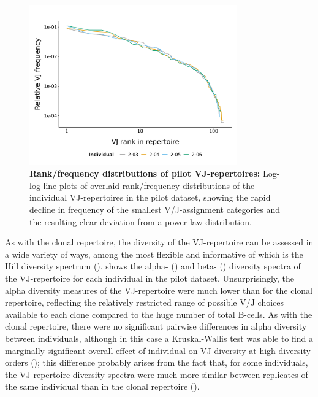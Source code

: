 \begin{figure}
\centering
\includegraphics[width=0.8\textwidth]{_Figures/png/pilot-vj-rank-frequency}
\caption[Rank/frequency distributions of pilot VJ-repertoires]{\textbf{Rank/frequency distributions of pilot VJ-repertoires:} Log-log line plots of overlaid rank/frequency distributions of the individual VJ-repertoires in the \igseq pilot dataset, showing the rapid decline in frequency of the smallest V/J-assignment categories and the resulting clear deviation from a power-law distribution.}
\label{fig:igseq-pilot-vj-rank-frequency}
\end{figure}

As with the clonal repertoire, the diversity of the VJ-repertoire can be assessed in a wide variety of ways, among the most flexible and informative of which is the Hill diversity spectrum ().  shows the alpha- () and beta- () diversity spectra of the VJ-repertoire for each individual in the pilot dataset. Unsurprisingly, the alpha diversity measures of the VJ-repertoire were much lower than for the clonal repertoire, reflecting the relatively restricted range of possible V/J choices available to each clone compared to the huge number of total \naive B-cells. As with the clonal repertoire, there were no significant pairwise differences in alpha diversity between individuals, although in this case a Kruskal-Wallis test was able to find a marginally significant overall effect of individual on VJ diversity at high diversity orders (); this difference probably arises from the fact that, for some individuals, the VJ-repertoire diversity spectra were much more similar between replicates of the same individual than in the clonal repertoire (). 

